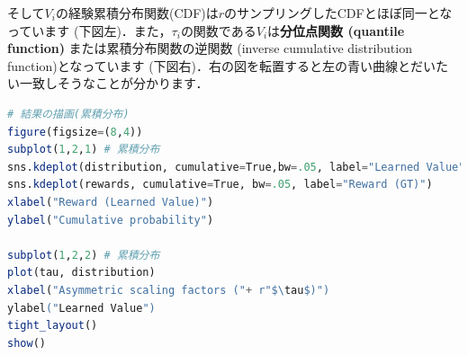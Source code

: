 そして$V_i$の経験累積分布関数(CDF)は$r$のサンプリングしたCDFとほぼ同一となっています (下図左)．また，$\tau_i$の関数である$V_i$は\textbf{分位点関数 (quantile function)} または累積分布関数の逆関数 (inverse cumulative distribution function)となっています
(下図右)．右の図を転置すると左の青い曲線とだいたい一致しそうなことが分かります．
\begin{lstlisting}[language=julia]
# 結果の描画(累積分布)
figure(figsize=(8,4))
subplot(1,2,1) # 累積分布
sns.kdeplot(distribution, cumulative=True,bw=.05, label="Learned Value")
sns.kdeplot(rewards, cumulative=True, bw=.05, label="Reward (GT)")
xlabel("Reward (Learned Value)")
ylabel("Cumulative probability")
 
subplot(1,2,2) # 累積分布
plot(tau, distribution)
xlabel("Asymmetric scaling factors ("+ r"$\tau$)")
ylabel("Learned Value")
tight_layout()
show()
\end{lstlisting}
